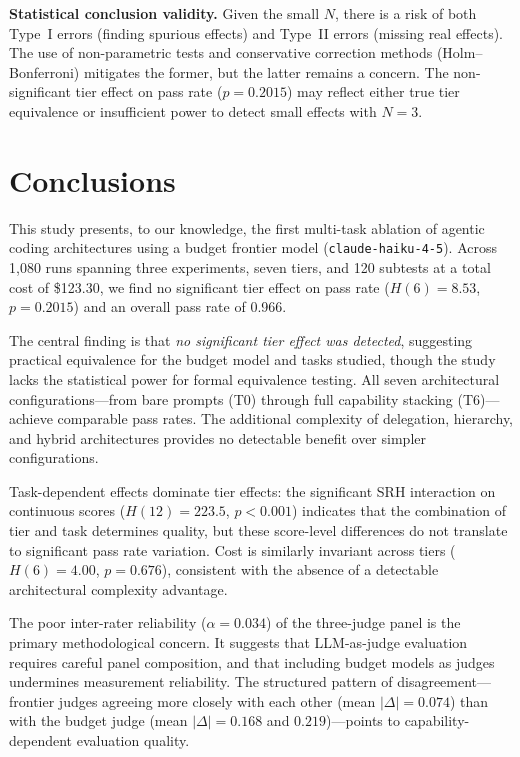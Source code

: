 \documentclass[11pt]{article}
\begin{document}
\textbf{Statistical conclusion validity.} Given the small $N$, there is a
risk of both Type~I errors (finding spurious effects) and Type~II errors
(missing real effects). The use of non-parametric tests and conservative
correction methods (Holm--Bonferroni) mitigates the former, but the latter
remains a concern. The non-significant tier effect on pass rate ($p=0.2015$)
may reflect either true tier equivalence or insufficient power to detect
small effects with $N=3$.

\section{Conclusions}
\label{sec:conclusions}

This study presents, to our knowledge, the first multi-task ablation of
agentic coding architectures using a budget frontier model (\texttt{claude-haiku-4-5}).
Across 1,080 runs spanning three experiments, seven tiers, and 120 subtests
at a total cost of \$123.30, we find no significant tier effect on pass rate
($H(6)=8.53$, $p=0.2015$) and an overall pass rate of 0.966.

The central finding is that \emph{no significant tier effect was detected},
suggesting practical equivalence for the budget model and tasks studied,
though the study lacks the statistical power for formal equivalence testing.
All seven architectural configurations---from bare prompts (T0) through full
capability stacking (T6)---achieve comparable pass rates. The additional
complexity of delegation, hierarchy, and hybrid architectures provides no
detectable benefit over simpler configurations.

Task-dependent effects dominate tier effects: the significant SRH interaction
on continuous scores ($H(12) = 223.5$, $p < 0.001$) indicates that the
combination of tier and task determines quality, but these score-level
differences do not translate to significant pass rate variation. Cost is
similarly invariant across tiers ($H(6) = 4.00$, $p = 0.676$), consistent
with the absence of a detectable architectural complexity advantage.

The poor inter-rater reliability ($\alpha = 0.034$) of the three-judge
panel is the primary methodological concern. It suggests that LLM-as-judge
evaluation requires careful panel composition, and that including budget
models as judges undermines measurement reliability. The structured pattern
of disagreement---frontier judges agreeing more closely with each other
(mean $|\Delta| = 0.074$) than with the budget judge (mean $|\Delta| = 0.168$
and $0.219$)---points to capability-dependent evaluation quality.
\end{document}
